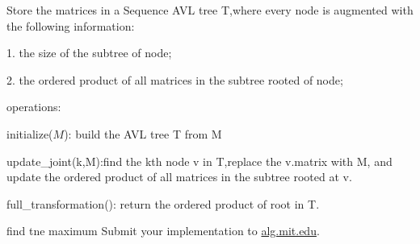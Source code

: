 \documentclass[12pt,twoside]{article}
\begin{document}
\begin{problems}
\newpage
\problem  %
Store the matrices in a Sequence AVL tree T,where every node is augmented with the following information:\par
1. the size of the subtree of node;\par
2. the ordered product of all matrices in the subtree rooted of node;\par
operations:\par
initialize($M$): build the AVL tree T from M\par
update\_joint(k,M):find the kth node v in T,replace the v.matrix with M, and update the ordered product of all matrices in the subtree rooted at v.\par
full\_transformation(): return the ordered product of root in T.\par
\newpage
\problem  %
\begin{problemparts}
\problempart %
find tne maximum 
\problempart %
\problempart %
\problempart Submit your implementation to {\small\url{alg.mit.edu}}.
\end{problemparts}

\end{problems}
\end{document}
